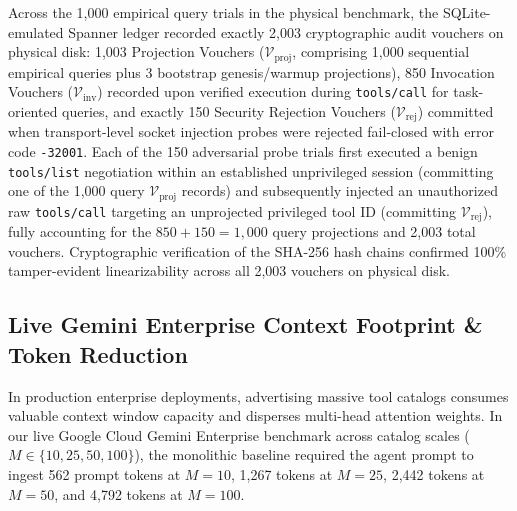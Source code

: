 \documentclass[conference,10pt]{IEEEtran}
\begin{document}
Across the 1,000 empirical query trials in the physical benchmark, the SQLite-emulated Spanner ledger recorded exactly 2,003 cryptographic audit vouchers on physical disk: 1,003 Projection Vouchers ($\mathcal{V}_{\text{proj}}$, comprising 1,000 sequential empirical queries plus 3 bootstrap genesis/warmup projections), 850 Invocation Vouchers ($\mathcal{V}_{\text{inv}}$) recorded upon verified execution during \texttt{tools/call} for task-oriented queries, and exactly 150 Security Rejection Vouchers ($\mathcal{V}_{\text{rej}}$) committed when transport-level socket injection probes were rejected fail-closed with error code \texttt{-32001}. Each of the 150 adversarial probe trials first executed a benign \texttt{tools/list} negotiation within an established unprivileged session (committing one of the 1,000 query $\mathcal{V}_{\text{proj}}$ records) and subsequently injected an unauthorized raw \texttt{tools/call} targeting an unprojected privileged tool ID (committing $\mathcal{V}_{\text{rej}}$), fully accounting for the $850 + 150 = 1{,}000$ query projections and 2,003 total vouchers. Cryptographic verification of the SHA-256 hash chains confirmed 100\% tamper-evident linearizability across all 2,003 vouchers on physical disk.

\subsection{Live Gemini Enterprise Context Footprint \& Token Reduction}
In production enterprise deployments, advertising massive tool catalogs consumes valuable context window capacity and disperses multi-head attention weights. In our live Google Cloud Gemini Enterprise benchmark across catalog scales ($M \in \{10, 25, 50, 100\}$), the monolithic baseline required the agent prompt to ingest 562 prompt tokens at $M=10$, 1,267 tokens at $M=25$, 2,442 tokens at $M=50$, and 4,792 tokens at $M=100$.
\end{document}
